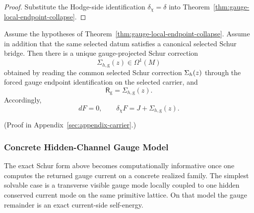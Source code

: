 \begin{proof}
Substitute the Hodge-side identification \(\delta_{\chi}=\delta\) into
Theorem~\ref{thm:gauge-local-endpoint-collapse}.
\end{proof}

\begin{corollary}
\label{cor:gauge-schur-remainder-identity}
Assume the hypotheses of
Theorem~\ref{thm:gauge-local-endpoint-collapse}. Assume in addition that the
same selected datum satisfies a canonical selected Schur bridge. Then there is
a unique gauge-projected Schur correction
\[
\Sigma_{h,\mathrm g}(z)\in\Omega^1(M)
\]
obtained by reading the common selected Schur correction \(\Sigma_{h}(z)\)
through the forced gauge endpoint identification on the selected carrier, and
\[
\mathsf R_{\mathrm g}=\Sigma_{h,\mathrm g}(z).
\]
Accordingly,
\[
dF=0,
\qquad
\delta_{\chi}F=J+\Sigma_{h,\mathrm g}(z).
\]
\end{corollary}

(Proof in Appendix~\ref{sec:appendix-carrier}.)

\subsubsection{Concrete Hidden-Channel Gauge Model}

The exact Schur form above becomes computationally informative once one
computes the returned gauge current on a concrete realized family. The
simplest solvable case is a transverse visible gauge mode locally coupled to
one hidden conserved current mode on the same primitive lattice. On that
model the gauge remainder is an exact current-side self-energy.

